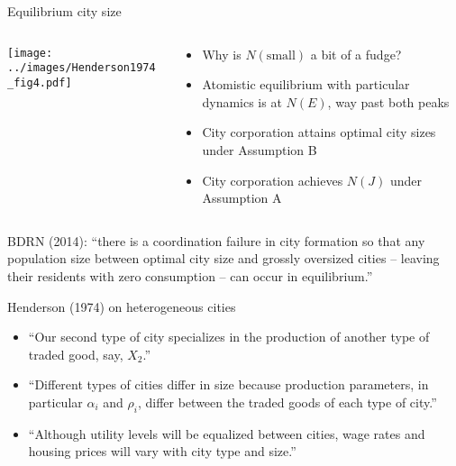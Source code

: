 \documentclass[10pt,notes=hide]{beamer}
\begin{document}
\begin{frame}{Equilibrium city size}
\begin{columns}
\begin{column}{.48\textwidth}
\texttt{[image: ../images/Henderson1974\_fig4.pdf]}
\end{column}
\begin{column}{.5\textwidth}
\begin{itemize}
\item Why is $N(\text{small})$ a bit of a fudge?
\item Atomistic equilibrium with particular dynamics is at $N(E)$, way past both peaks
\item City corporation attains optimal city sizes under Assumption B
\item City corporation achieves $N(J)$ under Assumption A
\end{itemize}
\end{column}
\end{columns}
{\footnotesize BDRN (2014): ``there is a coordination failure in city formation so that any population size between optimal city size and grossly oversized cities -- leaving their residents with zero consumption -- can occur in equilibrium.''\par}
\end{frame}
\begin{frame}{Henderson (1974) on heterogeneous cities}
\begin{itemize}
    \item ``Our second type of city specializes in the production of another type of traded good, say, $X_2$.''
    \item ``Different types of cities differ in size because production parameters, in particular $\alpha_i$ and $\rho_i$, differ between the traded goods of each type of city.''
    \item ``Although utility levels will be equalized between cities, wage rates and housing prices will vary with city type and size.''
\end{itemize}
\end{frame}
\end{document}

